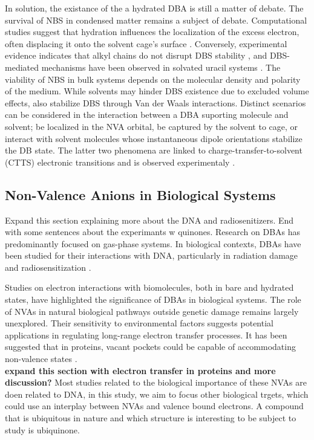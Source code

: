In solution, the existance of the a hydrated DBA is still a matter of debate\cite{anusiewicz2020fate,castellani2019stability}. The survival of NBS in condensed matter remains a subject of debate. Computational studies suggest that hydration influences the localization of the excess electron, often displacing it onto the solvent cage's surface \cite{anusiewicz2020fate}. Conversely, experimental evidence indicates that alkyl chains do not disrupt DBS stability \cite{castellani2019stability}, and DBS-mediated mechanisms have been observed in solvated uracil systems \cite{narayanan2024electron}. The viability of NBS in bulk systems depends on the molecular density and polarity of the medium. While solvents may hinder DBS existence due to excluded volume effects, also stabilize DBS through Van der Waals interactions\cite{bradforth2002excited,chen2000precursors}. Distinct scenarios can be considered in the interaction between a DBA suporting molecule and solvent; be localized in the NVA orbital, be captured by the solvent to cage, or interact with solvent molecules whose instantaneous dipole orientations stabilize the DB state. The latter two phenomena are linked to charge-transfer-to-solvent (CTTS) electronic transitions and is observed experimentaly \cite{simons2023molecular,bradforth2002excited,chen2000precursors}.

\subsection{Non-Valence Anions in Biological Systems}
Expand this section explaining more about the DNA and radiosenitizers. End with some sentences about the experimants w quinones.
Research on DBAs has predominantly focused on gas-phase systems. In biological contexts, DBAs have been studied for their interactions with DNA, particularly in radiation damage and radiosensitization \cite{gu2012interactions,narayanan2023secondary,sedmidubska2024interaction}. 

Studies on electron interactions with biomolecules, both in bare and hydrated states, have highlighted the significance of DBAs in biological systems. The role of NVAs in natural biological pathways outside genetic damage remains largely unexplored. Their sensitivity to environmental factors suggests potential applications in regulating long-range electron transfer processes. It has been suggested that in proteins, vacant pockets could be capable of accommodating non-valence states \cite{castellani2019stability}.\\
\textbf{expand this section with electron transfer in proteins and more discussion?}
Most studies related to the biological importance of these NVAs are doen related to DNA, in this study, we aim to focus other biological trgets, which could use an interplay between NVAs and valence bound electrons. A compound that is ubiquitous in nature and which structure is interesting to be subject to study is ubiquinone.

